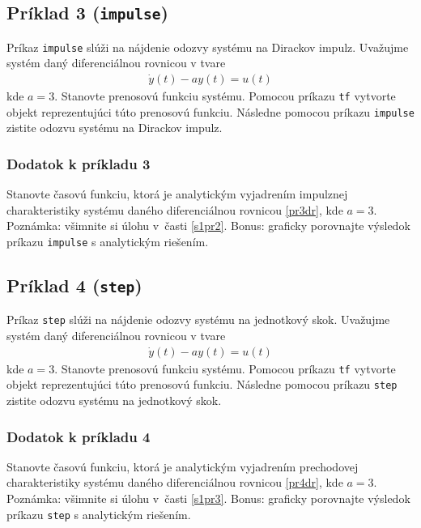 \documentclass[a4paper, 10pt, ]{article}
\begin{document}
\subsection{Príklad 3 (\lstinline|impulse|)}

Príkaz \lstinline|impulse| slúži na nájdenie odozvy systému na Dirackov impulz. Uvažujme systém daný diferenciálnou rovnicou v tvare 
\begin{align} \label{pr3dr}
    \dot y(t) - a y(t) = u(t) 
\end{align}
kde $a = 3$. Stanovte prenosovú funkciu systému. Pomocou príkazu \lstinline|tf| vytvorte objekt reprezentujúci túto prenosovú funkciu. Následne pomocou príkazu \lstinline|impulse| zistite odozvu systému na Dirackov impulz. 

\subsubsection{Dodatok k príkladu 3}
Stanovte časovú funkciu, ktorá je analytickým vyjadrením impulznej charakteristiky systému daného diferenciálnou rovnicou \eqref{pr3dr}, kde $a = 3$. Poznámka: všimnite si úlohu v~časti \ref{s1pr2}. Bonus: graficky porovnajte výsledok príkazu \lstinline|impulse| s analytickým riešením.





\subsection{Príklad 4 (\lstinline|step|)}

Príkaz \lstinline|step| slúži na nájdenie odozvy systému na jednotkový skok. Uvažujme systém daný diferenciálnou rovnicou v tvare 
\begin{align} \label{pr4dr}
    \dot y(t) - a y(t) = u(t) 
\end{align}
kde $a = 3$. Stanovte prenosovú funkciu systému. Pomocou príkazu \lstinline|tf| vytvorte objekt reprezentujúci túto prenosovú funkciu. Následne pomocou príkazu \lstinline|step| zistite odozvu systému na jednotkový skok. 

\subsubsection{Dodatok k príkladu 4}
Stanovte časovú funkciu, ktorá je analytickým vyjadrením prechodovej charakteristiky systému daného diferenciálnou rovnicou \eqref{pr4dr}, kde $a = 3$. Poznámka: všimnite si úlohu v~časti \ref{s1pr3}. Bonus: graficky porovnajte výsledok príkazu \lstinline|step| s analytickým riešením.
\end{document}

